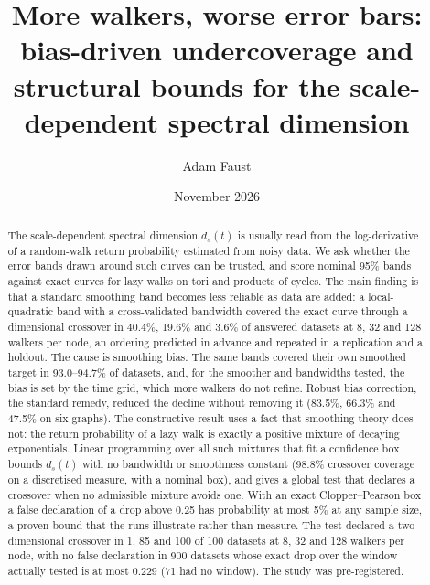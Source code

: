\documentclass[aps,pre,twocolumn,superscriptaddress,nofootinbib,10pt]{revtex4-2}
\begin{document}
\title{More walkers, worse error bars: bias-driven undercoverage and structural bounds for the scale-dependent spectral dimension}

\author{Adam Faust}
\date{November 2026}

\begin{abstract}
The scale-dependent spectral dimension $d_s(t)$ is usually read from the log-derivative of a random-walk return probability estimated from noisy data. We ask whether the error bands drawn around such curves can be trusted, and score nominal 95\% bands against exact curves for lazy walks on tori and products of cycles. The main finding is that a standard smoothing band becomes less reliable as data are added: a local-quadratic band with a cross-validated bandwidth covered the exact curve through a dimensional crossover in 40.4\%, 19.6\% and 3.6\% of answered datasets at 8, 32 and 128 walkers per node, an ordering predicted in advance and repeated in a replication and a holdout. The cause is smoothing bias. The same bands covered their own smoothed target in 93.0--94.7\% of datasets, and, for the smoother and bandwidths tested, the bias is set by the time grid, which more walkers do not refine. Robust bias correction, the standard remedy, reduced the decline without removing it (83.5\%, 66.3\% and 47.5\% on six graphs). The constructive result uses a fact that smoothing theory does not: the return probability of a lazy walk is exactly a positive mixture of decaying exponentials. Linear programming over all such mixtures that fit a confidence box bounds $d_s(t)$ with no bandwidth or smoothness constant (98.8\% crossover coverage on a discretised measure, with a nominal box), and gives a global test that declares a crossover when no admissible mixture avoids one. With an exact Clopper--Pearson box a false declaration of a drop above 0.25 has probability at most 5\% at any sample size, a proven bound that the runs illustrate rather than measure. The test declared a two-dimensional crossover in 1, 85 and 100 of 100 datasets at 8, 32 and 128 walkers per node, with no false declaration in 900 datasets whose exact drop over the window actually tested is at most 0.229 (71 had no window). The study was pre-registered.
\end{abstract}

\maketitle
\end{document}
